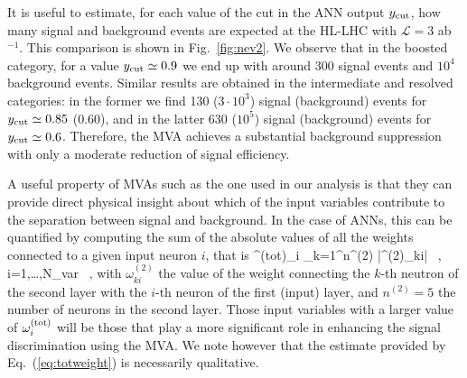 It is useful to estimate, for each value of
the cut in the ANN output $y_{\rm cut}$, how many
signal and background events are expected at the HL-LHC
with $\mathcal{L}=3$ ab$^{-1}$.
%
This comparison is shown in 
Fig.~\ref{fig:nev2}.
%
We observe that
in the boosted category, for a value $y_{\rm cut}\simeq 0.9$
we end up with around 300 signal events and $10^4$ background
events.
%
Similar results are obtained in the intermediate and resolved
categories: in the former we find 130 ($3\cdot 10^3$) signal (background)
events for $y_{\rm cut}\simeq 0.85$ (0.60), and in the latter
630 ($10^5$) signal (background) events for
$y_{\rm cut}\simeq 0.6$.
%
Therefore, the MVA achieves a
substantial background suppression
with only a
moderate reduction of signal efficiency.

A useful property of MVAs such as the one used in our
analysis
is that they can provide direct  physical insight about which of the
input variables contribute to the separation between
signal and background.
%
In the case of ANNs, this can be quantified by computing the sum
of the absolute values of all the weights connected to a given
input neuron $i$, that is
\be
\label{eq:totweight}
\omega^{\rm (tot)}_i \equiv \sum_{k=1}^{n^{(2)}} \Big|\omega^{(2)}_{ki}\Big| \, ,
\qquad i=1,\ldots,N_{\rm var} \, ,
\ee
with $\omega^{(2)}_{ki}$ the value of the weight connecting
the $k$-th neutron of the second layer with the $i$-th neuron of
the first (input) layer, and $n^{(2)}=5$ the number of
neurons in the second layer.
%
Those input variables with a larger value of $\omega^{\rm (tot)}_i$ will be those
that play a more significant role in enhancing the signal
discrimination using the MVA.
%
We note however
that the estimate provided
by Eq.~(\ref{eq:totweight}) is necessarily qualitative.

